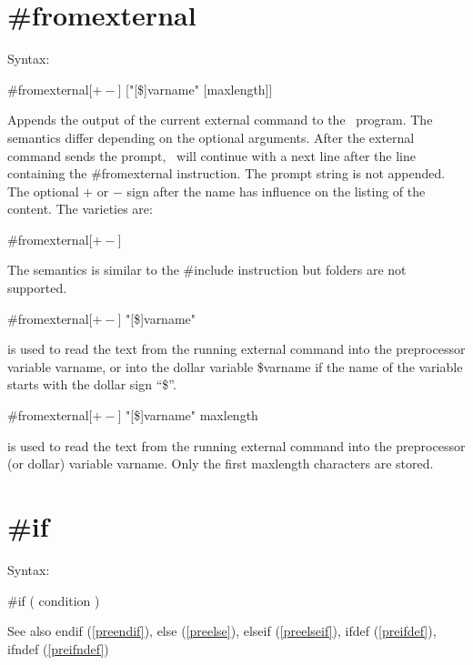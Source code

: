 
\section{\#fromexternal}
\label{prefromexternal}

\noindent Syntax:

\#fromexternal[$+-$] ["[\$]varname" [maxlength]]

\noindent Appends the output of the current external 
command to the \FORM\ program. The semantics differ depending on the optional 
arguments. After the external command sends the prompt, \FORM\ 
will continue with a next line after the line containing the \#fromexternal 
instruction. The prompt string is not appended. The optional $+$ or $-$ sign 
after the name has influence on the listing of the content. The varieties 
are:
                                                           
\#fromexternal[$+-$]

\noindent The semantics is similar to the \#include 
instruction but folders are not supported. 

\#fromexternal[$+-$] "[\$]varname"

\noindent is used to read the text from the running external command into 
the preprocessor variable varname, or into the dollar variable \$varname if 
the name of the variable starts with the dollar sign ``\$''.

\#fromexternal[$+-$] "[\$]varname" maxlength

\noindent is used to read the text from the running external command into 
the preprocessor (or dollar) variable varname. Only the first maxlength 
characters are stored.


\section{\#if}
\label{preif}

\noindent Syntax:

\#if ( condition )
 
\noindent See also endif (\ref{preendif}),
            else (\ref{preelse}),
            elseif (\ref{preelseif}),
            ifdef (\ref{preifdef}),
            ifndef (\ref{preifndef})

